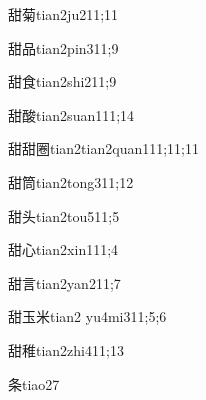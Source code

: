 \begin{verbete}{甜菊}{tian2ju2}{11;11}
\end{verbete}

\begin{verbete}{甜品}{tian2pin3}{11;9}
\end{verbete}

\begin{verbete}{甜食}{tian2shi2}{11;9}
\end{verbete}

\begin{verbete}{甜酸}{tian2suan1}{11;14}
\end{verbete}

\begin{verbete}{甜甜圈}{tian2tian2quan1}{11;11;11}
\end{verbete}

\begin{verbete}{甜筒}{tian2tong3}{11;12}
\end{verbete}

\begin{verbete}{甜头}{tian2tou5}{11;5}
\end{verbete}

\begin{verbete}{甜心}{tian2xin1}{11;4}
\end{verbete}

\begin{verbete}{甜言}{tian2yan2}{11;7}
\end{verbete}

\begin{verbete}{甜玉米}{tian2 yu4mi3}{11;5;6}
\end{verbete}

\begin{verbete}{甜稚}{tian2zhi4}{11;13}
\end{verbete}

\begin{verbete}{条}{tiao2}{7}
\end{verbete}

